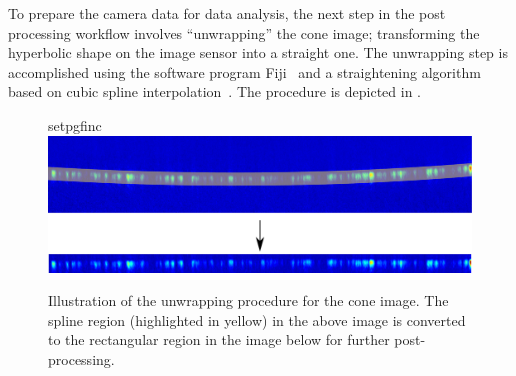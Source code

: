 To prepare the camera data for data analysis, the next step in the post
processing workflow involves ``unwrapping'' the cone image; transforming the
hyperbolic shape on the image sensor into a straight one.  The unwrapping step
is accomplished using the software program Fiji~\cite{schindelin2012fiji} and a
straightening algorithm based on cubic spline
interpolation~\cite{kocsis1991image}.  The procedure is depicted in .  
\begin{figure}[ht]
\centering
{setpgfinc}
\includegraphics[keepaspectratio,width=15cm]{experimental/figures/extractspkline.pdf}
\caption{Illustration of the unwrapping procedure for the cone image.  The spline region (highlighted in yellow) in the above image is converted to the rectangular region in the image below for further post-processing.}
\label{fig:extractspklineschematic}
\end{figure}
